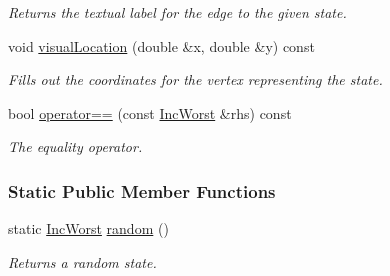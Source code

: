\begin{DoxyCompactItemize}
\begin{DoxyCompactList}\small\item\em Returns the textual label for the edge to the given state. \end{DoxyCompactList}\item 
void \hyperlink{structincWorst_1_1IncWorst_a5e25d277fd086fadabffa534c1255060}{visual\+Location} (double \&x, double \&y) const 
\begin{DoxyCompactList}\small\item\em Fills out the coordinates for the vertex representing the state. \end{DoxyCompactList}\item 
bool \hyperlink{structincWorst_1_1IncWorst_a972cd440c572bd89494c58fb6b210b85}{operator==} (const \hyperlink{structincWorst_1_1IncWorst}{Inc\+Worst} \&rhs) const 
\begin{DoxyCompactList}\small\item\em The equality operator. \end{DoxyCompactList}\end{DoxyCompactItemize}
\subsubsection*{Static Public Member Functions}
\begin{DoxyCompactItemize}
\item 
static \hyperlink{structincWorst_1_1IncWorst}{Inc\+Worst} \hyperlink{structincWorst_1_1IncWorst_a3efb513cd319be10dee6480352b02e7a}{random} ()
\begin{DoxyCompactList}\small\item\em Returns a random state. \end{DoxyCompactList}\end{DoxyCompactItemize}
